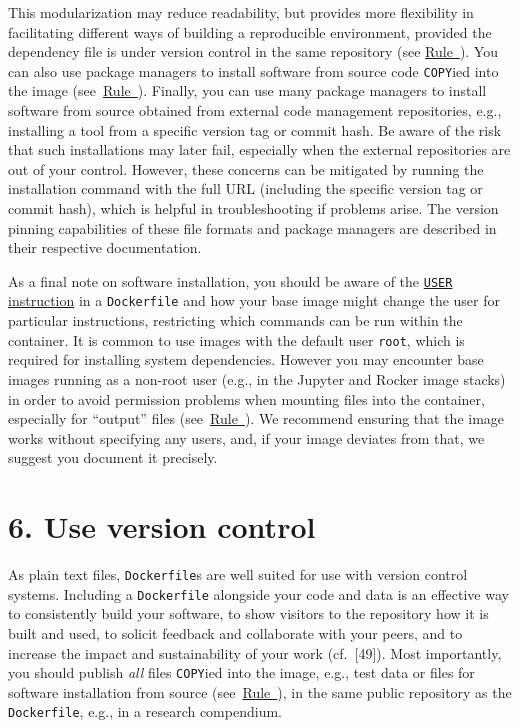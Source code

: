\documentclass[10pt,letterpaper]{article}
\begin{document}
This modularization may reduce readability, but provides more
flexibility in facilitating different ways of building a reproducible
environment, provided the dependency file is under version control in
the same repository (see
\hyperref[{rule:publish}]{Rule~}). You can also
use package managers to install software from source code
\texttt{COPY}ied into the image
(see~\hyperref[{rule:mount}]{Rule~}). Finally, you
can use many package managers to install software from source obtained
from external code management repositories, e.g., installing a tool from
a specific version tag or commit hash. Be aware of the risk that such
installations may later fail, especially when the external repositories
are out of your control. However, these concerns can be mitigated by
running the installation command with the full URL (including the
specific version tag or commit hash), which is helpful in
troubleshooting if problems arise. The version pinning capabilities of
these file formats and package managers are described in their
respective documentation.

As a final note on software installation, you should be aware of the
\href{https://docs.docker.com/engine/reference/builder/\#user}{\texttt{USER}
instruction} in a \texttt{Dockerfile} and how your base image might
change the user for particular instructions, restricting which commands
can be run within the container. It is common to use images with the
default user \texttt{root}, which is required for installing system
dependencies. However you may encounter base images running as a
non-root user (e.g., in the Jupyter and Rocker image stacks) in order to
avoid permission problems when mounting files into the container,
especially for ``output'' files
(see~\hyperref[{rule:mount}]{Rule~}). We recommend
ensuring that the image works without specifying any users, and, if your
image deviates from that, we suggest you document it precisely.

\hypertarget{use-version-control}{%
\section*{6. Use version control}\label{use-version-control}}

  \label{rule:publish} 

As plain text files, \texttt{Dockerfile}s are well suited for use with
version control systems. Including a \texttt{Dockerfile} alongside your
code and data is an effective way to consistently build your software,
to show visitors to the repository how it is built and used, to solicit
feedback and collaborate with your peers, and to increase the impact and
sustainability of your work (cf.~{[}49{]}). Most importantly, you should
publish \emph{all} files \texttt{COPY}ied into the image, e.g., test
data or files for software installation from source
(see~\hyperref[{rule:mount}]{Rule~}), in the same
public repository as the \texttt{Dockerfile}, e.g., in a research
compendium.
\end{document}
